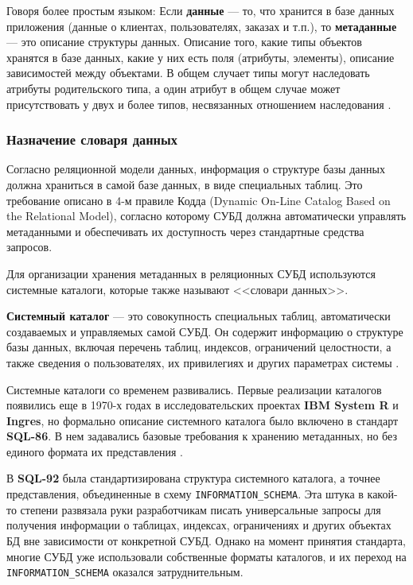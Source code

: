 Говоря более простым языком: 
Если \textbf{данные} — то, что хранится в базе данных приложения (данные о клиентах, пользователях, заказах и т.п.), то \textbf{метаданные} — это описание структуры данных. Описание того, какие типы объектов хранятся в базе данных, какие у них есть поля (атрибуты, элементы), описание зависимостей между объектами. В общем случает типы могут наследовать атрибуты родительского типа, а один атрибут в общем случае может присутствовать у двух и более типов, несвязанных отношением наследования \autocite{Metadatahabr}.

\subsubsection{Назначение словаря данных}

Согласно реляционной модели данных, информация о структуре базы данных должна храниться в самой базе данных, в виде специальных таблиц. Это требование описано в 4-м правиле Кодда (Dynamic On-Line Catalog Based on the Relational Model), согласно которому СУБД должна автоматически управлять метаданными и обеспечивать их доступность через стандартные средства запросов.

Для организации хранения метаданных в реляционных СУБД используются системные каталоги, которые также называют <<словари данных>>.

\begin{grayquote}
    \textbf{Системный каталог} — это совокупность специальных таблиц, автоматически создаваемых и управляемых самой СУБД. Он содержит информацию о структуре базы данных, включая перечень таблиц, индексов, ограничений целостности, а также сведения о пользователях, их привилегиях и других параметрах системы \autocite{IntuitLec14}.
\end{grayquote}

Системные каталоги со временем развивались. Первые реализации каталогов появились еще в 1970-х годах в исследовательских проектах \textbf{IBM System R} и \textbf{Ingres}, но формально описание системного каталога было включено в стандарт \textbf{SQL-86}. В нем задавались базовые требования к хранению метаданных, но без единого формата их представления \autocite{DictHist}.

В \textbf{SQL-92} была стандартизирована структура системного каталога, а точнее представления, объединенные в схему \texttt{INFORMATION\_SCHEMA}. Эта штука в какой-то степени развязала руки разработчикам писать универсальные запросы для получения информации о таблицах, индексах, ограничениях и других объектах БД вне зависимости от конкретной СУБД. Однако на момент принятия стандарта, многие СУБД уже использовали собственные форматы каталогов, и их переход на \texttt{INFORMATION\_SCHEMA} оказался затруднительным.

